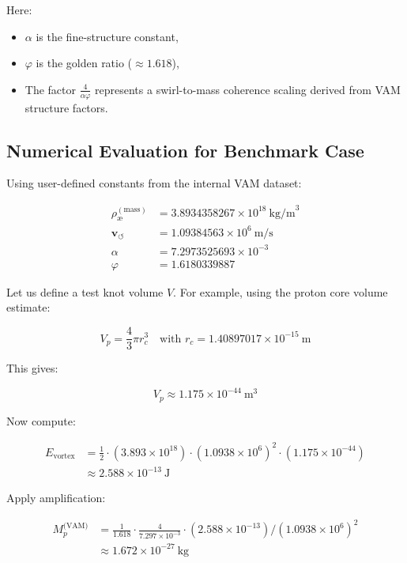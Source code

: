 \documentclass[twocolumn,aps,pre,floatfix,nofootinbib]{revtex4-2}
\begin{document}
Here:
\begin{itemize}
\item \( \alpha \) is the fine-structure constant,
\item \( \varphi \) is the golden ratio (\( \approx 1.618 \)),
\item The factor \( \frac{4}{\alpha \varphi} \) represents a swirl-to-mass coherence scaling derived from VAM structure factors.
\end{itemize}

\subsection{Numerical Evaluation for Benchmark Case}

Using user-defined constants from the internal VAM dataset:

\begin{align*}
\rho_\text{\ae}^{(\text{mass})} &= 3.8934358267 \times 10^{18} \ \text{kg/m}^3 \\
\mathbf{v}_{\scriptscriptstyle\boldsymbol{\circlearrowleft}} &= 1.09384563 \times 10^6 \ \text{m/s} \\
\alpha &= 7.2973525693 \times 10^{-3} \\
\varphi &= 1.6180339887
\end{align*}

Let us define a test knot volume \( V \). For example, using the proton core volume estimate:

\[
V_p = \frac{4}{3} \pi r_c^3 \quad \text{with } r_c = 1.40897017 \times 10^{-15} \ \text{m}
\]

This gives:

\[
V_p \approx 1.175 \times 10^{-44} \ \text{m}^3
\]

Now compute:

\begin{align*}
E_{\text{vortex}} &= \frac{1}{2} \cdot (3.893 \times 10^{18}) \cdot (1.0938 \times 10^6)^2 \cdot (1.175 \times 10^{-44}) \\
&\approx 2.588 \times 10^{-13} \ \text{J}
\end{align*}

Apply amplification:

\begin{align*}
M_p^{\text{(VAM)}} &= \frac{1}{1.618} \cdot \frac{4}{7.297 \times 10^{-3}} \cdot \left( 2.588 \times 10^{-13} \right) / (1.0938 \times 10^6)^2 \\
&\approx 1.672 \times 10^{-27} \ \text{kg}
\end{align*}
\end{document}
